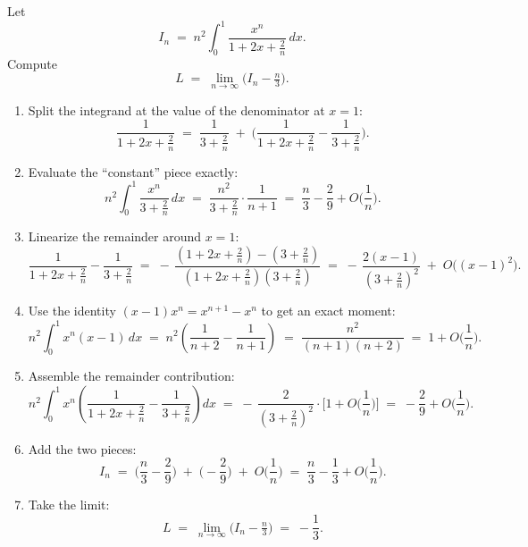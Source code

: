 Let
\[
I_n \;=\; n^2 \int_{0}^{1}\frac{x^{n}}{1+2x+\frac{2}{n}}\,dx.
\]
Compute
\[
L \;=\; \lim_{n\to\infty}\Big( I_n - \tfrac{n}{3}\Big).
\]

\begin{enumerate}
    \item Split the integrand at the value of the denominator at $x=1$:
    \[
    \frac{1}{1+2x+\tfrac{2}{n}}
    \;=\; \frac{1}{3+\tfrac{2}{n}}
    \;+\;\Bigg(\frac{1}{1+2x+\tfrac{2}{n}}-\frac{1}{3+\tfrac{2}{n}}\Bigg).
    \]

    \item Evaluate the ``constant'' piece exactly:
    \[
    n^2\!\int_0^1 \frac{x^n}{3+\tfrac{2}{n}}\,dx
    \;=\; \frac{n^2}{3+\tfrac{2}{n}}\cdot\frac{1}{n+1}
    \;=\; \frac{n}{3}-\frac{2}{9}+O\!\Big(\frac{1}{n}\Big).
    \]

    \item Linearize the remainder around $x=1$:
    \[
    \frac{1}{1+2x+\tfrac{2}{n}}-\frac{1}{3+\tfrac{2}{n}}
    \;=\; -\,\frac{(1+2x+\tfrac{2}{n})-(3+\tfrac{2}{n})}{(1+2x+\tfrac{2}{n})(3+\tfrac{2}{n})}
    \;=\; -\,\frac{2(x-1)}{(3+\tfrac{2}{n})^2} \;+\; O\big((x-1)^2\big).
    \]

    \item Use the identity $(x-1)x^n = x^{n+1}-x^n$ to get an exact moment:
    \[
    n^2\!\int_0^1 x^n(x-1)\,dx
    \;=\; n^2\!\left(\frac{1}{n+2}-\frac{1}{n+1}\right)
    \;=\; \frac{n^2}{(n+1)(n+2)} \;=\; 1+O\!\Big(\frac{1}{n}\Big).
    \]

    \item Assemble the remainder contribution:
    \[
    n^2\!\int_0^1 x^n\!\left(\frac{1}{1+2x+\tfrac{2}{n}}-\frac{1}{3+\tfrac{2}{n}}\right)\!dx
    \;=\; -\,\frac{2}{(3+\tfrac{2}{n})^2}\cdot\Big[1+O\!\Big(\frac{1}{n}\Big)\Big]
    \;=\; -\frac{2}{9}+O\!\Big(\frac{1}{n}\Big).
    \]

    \item Add the two pieces:
    \[
    I_n \;=\; \Big(\frac{n}{3}-\frac{2}{9}\Big) \;+\; \Big(-\frac{2}{9}\Big) \;+\; O\!\Big(\frac{1}{n}\Big)
    \;=\; \frac{n}{3}-\frac{1}{3}+O\!\Big(\frac{1}{n}\Big).
    \]

    \item Take the limit:
    \[
    L \;=\; \lim_{n\to\infty}\Big(I_n-\tfrac{n}{3}\Big) \;=\; -\frac{1}{3}.
    \]
\end{enumerate}
